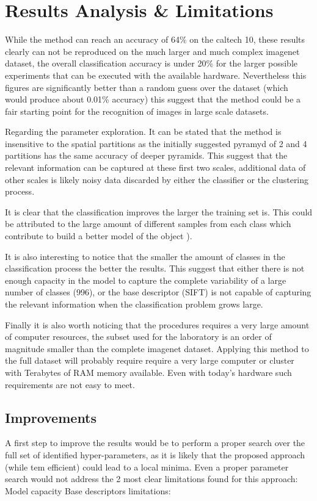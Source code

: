 \documentclass[10pt,twocolumn,letterpaper]{article}
\begin{document}
\section{Results Analysis \& Limitations}

While the method can reach an accuracy of 64\% on the caltech 10, these results clearly can not be reproduced on the much larger and much complex imagenet dataset, the overall classification accuracy is under 20\% for the larger possible experiments that can be executed with the available hardware. Nevertheless this figures are significantly better than a random guess over the dataset (which would produce about 0.01\% accuracy) this suggest that the method could be a fair starting point for the recognition of images in large scale datasets.

Regarding the parameter exploration. It can be stated that the method is insensitive to the spatial partitions as the initially suggested pyramyd of 2 and 4 partitions has the same accuracy of deeper pyramids. This suggest that the relevant information can be captured at these first two scales, additional data of other scales is likely noisy data discarded by either the classifier or the clustering process.

It is clear that the classification improves the larger the training set is. This could be attributed to the large amount of different samples from each class which contribute to build a better model of the object ).

It is  also interesting to notice that the smaller the amount of classes in the classification process the better the results. This suggest that either there is not enough capacity in the model to capture the complete variability of a large number of classes (996), or the base descriptor (SIFT) is not capable of capturing the relevant information when the classification problem grows large.

Finally it is also worth noticing that the procedures requires a very large amount of computer resources, the subset used for the laboratory is an order of magnitude smaller than the complete imagenet dataset. Applying this method to the full dataset will probably require require a very large computer or cluster with Terabytes of RAM memory available. Even with today's hardware such requirements are not easy to meet.

\subsection{Improvements}
A first step to improve the results would be to perform a proper search over the full set of identified hyper-parameters, as it is likely that the proposed approach (while tem efficient) could lead to a local minima. Even a proper parameter search would not address the 2 most clear limitations found for this approach: Model capacity Base descriptors limitations:
\end{document}
